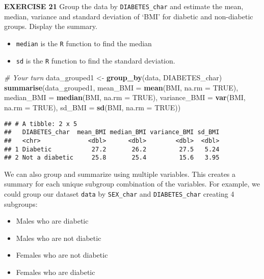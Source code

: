 \documentclass[
]{article}
\newenvironment{Shaded}{\begin{snugshade}}{\end{snugshade}}
\newcommand{\CommentTok}[1]{\textcolor[rgb]{0.56,0.35,0.01}{\textit{#1}}}
\newcommand{\DataTypeTok}[1]{\textcolor[rgb]{0.13,0.29,0.53}{#1}}
\newcommand{\KeywordTok}[1]{\textcolor[rgb]{0.13,0.29,0.53}{\textbf{#1}}}
\newcommand{\NormalTok}[1]{#1}
\newcommand{\OtherTok}[1]{\textcolor[rgb]{0.56,0.35,0.01}{#1}}
\newcommand{\StringTok}[1]{\textcolor[rgb]{0.31,0.60,0.02}{#1}}
\providecommand{\tightlist}{%
  \setlength{\itemsep}{0pt}\setlength{\parskip}{0pt}}
\begin{document}
\textbf{EXERCISE 21} Group the data by \texttt{DIABETES\_char} and
estimate the mean, median, variance and standard deviation of `BMI' for
diabetic and non-diabetic groups. Display the summary.

\begin{itemize}
\tightlist
\item
  \texttt{median} is the \texttt{R} function to find the median
\item
  \texttt{sd} is the \texttt{R} function to find the standard deviation.
\end{itemize}

\begin{Shaded}
\begin{Highlighting}[]
\CommentTok{# Your turn}
\NormalTok{data_grouped1 <-}\StringTok{ }\KeywordTok{group_by}\NormalTok{(data, DIABETES_char)}
\KeywordTok{summarise}\NormalTok{(data_grouped1, }
          \DataTypeTok{mean_BMI =} \KeywordTok{mean}\NormalTok{(BMI, }\DataTypeTok{na.rm =} \OtherTok{TRUE}\NormalTok{), }
          \DataTypeTok{median_BMI =} \KeywordTok{median}\NormalTok{(BMI, }\DataTypeTok{na.rm =} \OtherTok{TRUE}\NormalTok{), }
          \DataTypeTok{variance_BMI =} \KeywordTok{var}\NormalTok{(BMI, }\DataTypeTok{na.rm =} \OtherTok{TRUE}\NormalTok{), }
          \DataTypeTok{sd_BMI =} \KeywordTok{sd}\NormalTok{(BMI, }\DataTypeTok{na.rm =} \OtherTok{TRUE}\NormalTok{))}
\end{Highlighting}
\end{Shaded}

\begin{verbatim}
## # A tibble: 2 x 5
##   DIABETES_char  mean_BMI median_BMI variance_BMI sd_BMI
##   <chr>             <dbl>      <dbl>        <dbl>  <dbl>
## 1 Diabetic           27.2       26.2         27.5   5.24
## 2 Not a diabetic     25.8       25.4         15.6   3.95
\end{verbatim}

We can also group and summarize using multiple variables. This creates a
summary for each unique subgroup combination of the variables. For
example, we could group our dataset \texttt{data} by \texttt{SEX\_char}
and \texttt{DIABETES\_char} creating 4 subgroups:

\begin{itemize}
\tightlist
\item
  Males who are diabetic
\item
  Males who are not diabetic
\item
  Females who are not diabetic
\item
  Females who are diabetic
\end{itemize}
\end{document}
